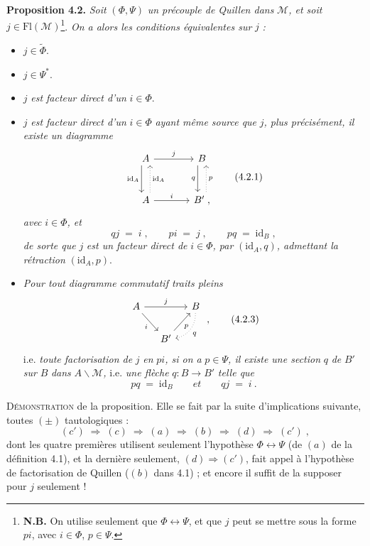 \documentclass[11pt]{article}
\newcommand{\printedpage}[1]{\marginpar{\footnotesize p.~#1}}
\newcommand{\msp}[1]{\marginpar{\footnotesize [#1]}}
\newcommand{\Fl}{\mathrm{Fl}}
\newcommand{\id}{\mathrm{id}}
\begin{document}
\textbf{Proposition 4.2.} \textit{Soit} $(\Phi,\Psi)$ \textit{un précouple de Quillen dans} $\mathcal{M}$\textit{, et soit} $j\in\Fl(\mathcal{M})$\footnote[9]{\textbf{N.B.} On utilise seulement que $\Phi\longleftrightarrow\Psi$, et que $j$ peut se mettre sous la forme $pi$, avec $i\in\Phi$, $p\in\Psi$.}. %
\textit{On a alors les conditions équivalentes sur} $j$ \textit{:}
\begin{itemize}[leftmargin=2.5em]
\item[a)] $j\in\widetilde{\Phi}$.
\item[b)] $j\in\Psi^*$.
\item[c)] $j$ \textit{est facteur direct d'un} $i\in\Phi$.
\item[c$'$)] $j$ \textit{est facteur direct d'un} $i\in\Phi$ \textit{ayant même source que} $j$\textit{, plus précisément, il existe un diagramme}
\[
\begin{tikzcd}[row sep=large, column sep=large]
A \arrow[r, "j"] \arrow[d, shift right=1ex, "\id_A"'] & B \arrow[d, shift right=1ex, "q"'] \\
A \arrow[u, dotted, shift right=1ex, "\id_A"'] \arrow[r, "i"] & B' \;, \arrow[u, dotted, shift right=1ex, "p"']
\end{tikzcd}
\tag*{(4.2.1)}
\]
\printedpage{20}
\textit{avec} $i\in\Phi$\textit{, et}
\[
qj \;=\; i\;, \qquad pi \;=\; j\;, \qquad pq \;=\; \id_B\;,
\tag*{(4.2.2)}
\]
\textit{de sorte que} $j$ \textit{est un facteur direct de} $i\in\Phi$\textit{, par} $(\id_A,q)$\textit{, admettant la rétraction} $(\id_A,p)$.
\item[d)] \textit{Pour tout diagramme commutatif traits pleins}
\[
\begin{tikzcd}[column sep=small]
A \arrow[rr, "j"] \arrow[dr, "i"'] & & B \arrow[dl, dotted, bend left=40, "q"] \\
& B' \arrow[ur, "p"'] &
\end{tikzcd}
\;,
\tag*{(4.2.3)}
\]
i.e. \textit{toute factorisation de} $j$ \textit{en} $pi$\textit{, si on a} $p\in\Psi$\textit{, il existe une section} $q$ \textit{de} $B'$ \textit{sur} $B$ \textit{dans} $A\backslash\mathcal{M}$\textit{,} i.e. \textit{une flèche} $q:B\longrightarrow B'$ \textit{telle que}
\[
pq \;=\; \id_B \qquad \textit{et} \qquad qj \;=\; i\ .
\]
\end{itemize}

\textsc{Démonstration} de la proposition. Elle se fait par la suite d'implications suivante, toutes $(\pm)$ tautologiques :
\[
(c') \;\Longrightarrow\; (c) \;\Longrightarrow\; (a) \;\Longrightarrow\; (b) \;\Longrightarrow\; (d) \;\Longrightarrow\; (c')\;,
\]
\msp{page 30}
dont les quatre premières utilisent seulement l'hypothèse $\Phi\longleftrightarrow\Psi$ (de $(a)$ de la définition 4.1), et la dernière seulement, $(d)\Longrightarrow(c')$, fait appel à l'hypothèse de factorisation de Quillen ($(b)$ dans 4.1) ; et encore il suffit de la supposer pour $j$ seulement !
\end{document}
